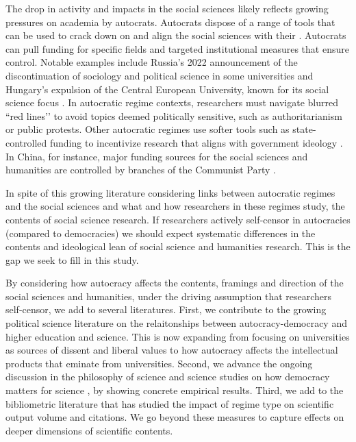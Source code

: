 \documentclass[12pt,a4paper]{article}
\begin{document}
The drop in activity and impacts in the social sciences likely reflects growing pressures on academia by autocrats. Autocrats dispose of a range of tools that can be used to crack down on and align the social sciences with their \citep{Beidollahkhani2025,Ma2023}. Autocrats can pull funding for specific fields and targeted institutional measures that ensure control. Notable examples include Russia’s 2022 announcement of the discontinuation of sociology and political science in some universities and Hungary’s expulsion of the Central European University, known for its social science focus \citep{Kosta2026,Tayebi2025}. In autocratic regime contexts, researchers must navigate blurred ``red lines’’ to avoid topics deemed politically sensitive, such as authoritarianism or public protests. Other autocratic regimes use softer tools such as state-controlled funding to incentivize research that aligns with government ideology \citep{Perry2020,Reny2016}. In China, for instance, major funding sources for the social sciences and humanities are controlled by branches of the Communist Party \citep{Holbig2014}.

In spite of this growing literature considering links between autocratic regimes and the social sciences and what and how researchers in these regimes study, the contents of social science research. If researchers actively self-censor in autocracies (compared to democracies) we should expect systematic differences in the contents and ideological lean of social science and humanities research. This is the gap we seek to fill in this study. 

By considering how autocracy affects the contents, framings and direction of the social sciences and humanities, under the driving assumption that researchers self-censor, we add to several literatures. First, we contribute to the growing political science literature on the relaitonships between autocracy-democracy and higher education and science. This is now expanding from focusing on universities as sources of dissent and liberal values \citep{Apfeld2024,Dahlum21} to how autocracy affects the intellectual products that eminate from universities. Second, we advance the ongoing discussion in the philosophy of science and science studies on how democracy matters for science \citep{Holst2026}, by showing concrete empirical results. Third, we add to the bibliometric literature that has studied the impact of regime type on scientific output volume and citations. We go beyond these measures to capture effects on deeper dimensions of scientific contents. 
\end{document}
